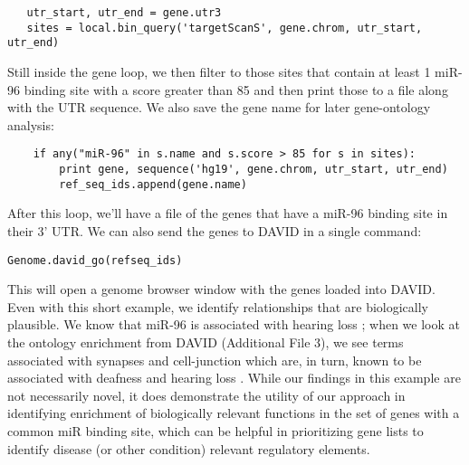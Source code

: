 \documentclass[10pt]{bmc_article}
\newenvironment{bmcformat}{\baselineskip20pt\sloppy\setboolean{publ}{false}}{\baselineskip20pt\sloppy}
\begin{document}
\begin{bmcformat}
\begin{verbatim}
   utr_start, utr_end = gene.utr3
   sites = local.bin_query('targetScanS', gene.chrom, utr_start, utr_end)
\end{verbatim}

Still inside the gene loop, we then filter to those sites that contain at least 1 miR-96 binding site with a score greater than 85 and then print those to a file along with the UTR sequence. We also save the gene name for later gene-ontology analysis:

\begin{verbatim}
    if any("miR-96" in s.name and s.score > 85 for s in sites):
        print gene, sequence('hg19', gene.chrom, utr_start, utr_end)
        ref_seq_ids.append(gene.name)
\end{verbatim}

After this loop, we’ll have a file of the genes that have a miR-96 binding site in their 3’ UTR. We can also send the genes to DAVID \cite{Huang} in a single command:

\begin{verbatim}
Genome.david_go(refseq_ids)
\end{verbatim}

This will open a genome browser window with the genes loaded into DAVID. Even with this short example, we identify relationships that are biologically plausible. We know that miR-96 is associated with hearing loss \cite{Mencia}; when we look at the ontology enrichment from DAVID (Additional File 3), we see terms associated with synapses and cell-junction which are, in turn, known to be associated with deafness and hearing loss \cite{Martinez}. While our findings in this example are not necessarily novel, it does demonstrate the utility of our approach in identifying enrichment of biologically relevant functions in the set of genes with a common miR binding site, which can be helpful in prioritizing gene lists to identify disease (or other condition) relevant regulatory elements.


\end{bmcformat}
\end{document}
